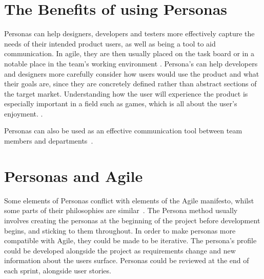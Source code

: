 \documentclass{scrartcl}
\begin{document}
\section{The Benefits of using Personas}
Personas can help designers, developers and testers more effectively capture the needs of their intended product users, as well as being a tool to aid communication. In agile, they are then usually placed on the task board or in a notable place in the team's working environment \cite{}. Persona's can help developers and designers more carefully consider how users would use the product and what their goals are, since they are concretely defined rather than abstract sections of the target market. Understanding how the user will experience the product is especially important in a field such as games, which is all about the user's enjoyment. \cite{}.

Personas can also be used as an effective communication tool between team members and departments~\cite{}.


\section{Personas and Agile}
Some elements of Personas conflict with elements of the Agile manifesto, whilst some parts of their philosophies are similar~\cite{haikara:extending}. The Persona method usually involves creating the personas at the beginning of the project before development begins, and sticking to them throughout. In order to make personas more compatible with Agile, they could be made to be iterative. The persona's profile could be developed alongside the project as requirements change and new information about the users surface. Personas could be reviewed at the end of each sprint, alongside user stories. 


\end{document}
